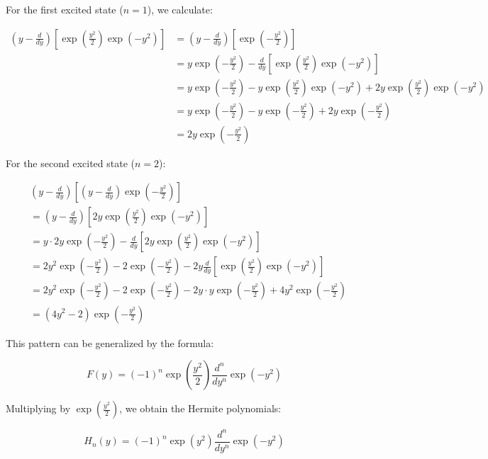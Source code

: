 \documentclass[italian]{HKNdocument}
\begin{document}
For the first excited state ($n=1$), we calculate:

\begin{align}
\left(y-\frac{d}{dy}\right)\left[\exp\left(\frac{y^2}{2}\right)\exp(-y^2)\right] &= \left(y-\frac{d}{dy}\right)\left[\exp\left(-\frac{y^2}{2}\right)\right] \\
&= y\exp\left(-\frac{y^2}{2}\right) - \frac{d}{dy}\left[\exp\left(\frac{y^2}{2}\right)\exp(-y^2)\right] \\
&= y\exp\left(-\frac{y^2}{2}\right) - y\exp\left(\frac{y^2}{2}\right)\exp(-y^2) + 2y\exp\left(\frac{y^2}{2}\right)\exp(-y^2) \\
&= y\exp\left(-\frac{y^2}{2}\right) - y\exp\left(-\frac{y^2}{2}\right) + 2y\exp\left(-\frac{y^2}{2}\right) \\
&= 2y\exp\left(-\frac{y^2}{2}\right) \label{eq:5.49}
\end{align}

For the second excited state ($n=2$):

\begin{align}
&\left(y-\frac{d}{dy}\right)\left[\left(y-\frac{d}{dy}\right)\exp\left(-\frac{y^2}{2}\right)\right] \\
&= \left(y-\frac{d}{dy}\right)\left[2y\exp\left(\frac{y^2}{2}\right)\exp(-y^2)\right] \\
&= y\cdot 2y\exp\left(-\frac{y^2}{2}\right) - \frac{d}{dy}\left[2y\exp\left(\frac{y^2}{2}\right)\exp(-y^2)\right] \label{eq:5.50} \\
&= 2y^2\exp\left(-\frac{y^2}{2}\right) - 2\exp\left(-\frac{y^2}{2}\right) - 2y\frac{d}{dy}\left[\exp\left(\frac{y^2}{2}\right)\exp(-y^2)\right] \\
&= 2y^2\exp\left(-\frac{y^2}{2}\right) - 2\exp\left(-\frac{y^2}{2}\right) - 2y\cdot y\exp\left(-\frac{y^2}{2}\right) + 4y^2\exp\left(-\frac{y^2}{2}\right) \\
&= (4y^2-2)\exp\left(-\frac{y^2}{2}\right)
\end{align}

This pattern can be generalized by the formula:

\begin{equation}
F(y) = (-1)^n\exp\left(\frac{y^2}{2}\right)\frac{d^n}{dy^n}\exp(-y^2) \label{eq:5.51}
\end{equation}

Multiplying by $\exp\left(\frac{y^2}{2}\right)$, we obtain the Hermite polynomials:

\begin{equation}
H_n(y) = (-1)^n\exp(y^2)\frac{d^n}{dy^n}\exp(-y^2) \label{eq:5.52}
\end{equation}
\end{document}
